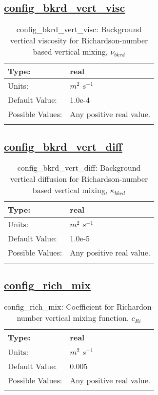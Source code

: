 \subsection[config\_bkrd\_vert\_visc]{\hyperref[sec:nm_tab_vmix_rich]{config\_bkrd\_vert\_visc}}
\label{subsec:nm_sec_config_bkrd_vert_visc}
\begin{center}
\begin{longtable}{| p{2.0in} || p{4.0in} |}
    \hline
    Type: & real \\
    \hline
    Units: & $m^2$ $s^{-1}$ \\
    \hline
    Default Value: & 1.0e-4 \\
    \hline
    Possible Values: & Any positive real value. \\
    \hline
    \caption{config\_bkrd\_vert\_visc:  Background vertical viscosity for Richardson-number based vertical mixing,  $\nu_{bkrd}$ }
\end{longtable}
\end{center}
\subsection[config\_bkrd\_vert\_diff]{\hyperref[sec:nm_tab_vmix_rich]{config\_bkrd\_vert\_diff}}
\label{subsec:nm_sec_config_bkrd_vert_diff}
\begin{center}
\begin{longtable}{| p{2.0in} || p{4.0in} |}
    \hline
    Type: & real \\
    \hline
    Units: & $m^2$ $s^{-1}$ \\
    \hline
    Default Value: & 1.0e-5 \\
    \hline
    Possible Values: & Any positive real value. \\
    \hline
    \caption{config\_bkrd\_vert\_diff:  Background vertical diffusion for Richardson-number based vertical mixing,  $\kappa_{bkrd}$ }
\end{longtable}
\end{center}
\subsection[config\_rich\_mix]{\hyperref[sec:nm_tab_vmix_rich]{config\_rich\_mix}}
\label{subsec:nm_sec_config_rich_mix}
\begin{center}
\begin{longtable}{| p{2.0in} || p{4.0in} |}
    \hline
    Type: & real \\
    \hline
    Units: & $m^2$ $s^{-1}$ \\
    \hline
    Default Value: & 0.005 \\
    \hline
    Possible Values: & Any positive real value. \\
    \hline
    \caption{config\_rich\_mix:  Coefficient for Richardon-number vertical mixing function,  $c_{Ri}$ }
\end{longtable}
\end{center}

